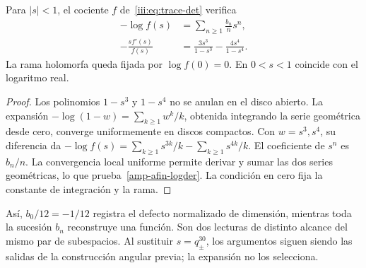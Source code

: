 \begin{theorem}
\label{amp-afin-thm-logdet}
Para $|s|<1$, el cociente $f$ de~\eqref{iii:eq:trace-det} verifica
\begin{align}
 -\log f(s)&=\sum_{n\geq1}\frac{b_n}{n}s^n,\label{amp-afin-logdet}\\
 -\frac{s f'(s)}{f(s)}
 &=\frac{3s^3}{1-s^3}-\frac{4s^4}{1-s^4}.
 \label{amp-afin-logder}
\end{align}
La rama holomorfa queda fijada por $\log f(0)=0$.
En $0<s<1$ coincide con el logaritmo real.
\end{theorem}
\begin{proof}
Los polinomios $1-s^3$ y $1-s^4$ no se anulan en el disco abierto.
La expansión $-\log(1-w)=\sum_{k\geq1}w^k/k$, obtenida integrando
la serie geométrica desde cero, converge uniformemente en discos
compactos. Con $w=s^3,s^4$, su diferencia da
$-\log f(s)=\sum_{k\geq1}s^{3k}/k-\sum_{k\geq1}s^{4k}/k$.
El coeficiente de $s^n$ es $b_n/n$.
La convergencia local uniforme permite derivar y sumar las dos series
geométricas, lo que prueba~\eqref{amp-afin-logder}.
La condición en cero fija la constante de integración y la rama.
\end{proof}

Así, $b_0/12=-1/12$ registra el defecto normalizado de dimensión,
mientras toda la sucesión $b_n$ reconstruye una función.
Son dos lecturas de distinto alcance del mismo par de subespacios.
Al sustituir $s=q_\pm^{30}$, los argumentos siguen siendo las salidas
de la construcción angular previa; la expansión no los selecciona.

